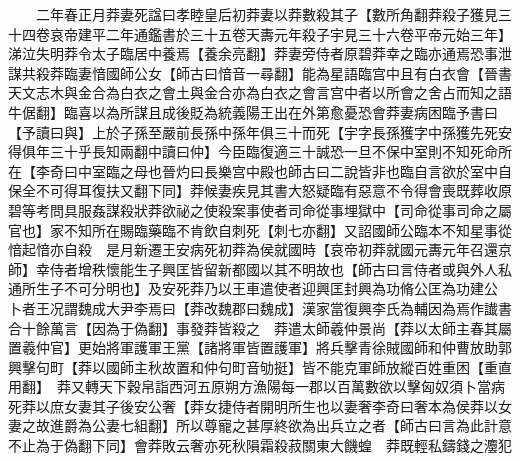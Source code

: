 　　二年春正月莽妻死諡曰孝睦皇后初莽妻以莽數殺其子【數所角翻莽殺子獲見三十四卷哀帝建平二年通鑑書於三十五卷天夀元年殺子宇見三十六卷平帝元始三年】涕泣失明莽令太子臨居中養焉【養余亮翻】莽妻旁侍者原碧莽幸之臨亦通焉恐事泄謀共殺莽臨妻愔國師公女【師古曰愔音一尋翻】能為星語臨宫中且有白衣會【晉書天文志木與金合為白衣之會土與金合亦為白衣之會言宫中者以所會之舍占而知之語牛倨翻】臨喜以為所謀且成後貶為統義陽王出在外第愈憂恐會莽妻病困臨予書曰【予讀曰與】上於子孫至嚴前長孫中孫年俱三十而死【宇字長孫獲字中孫獲先死安得俱年三十乎長知兩翻中讀曰仲】今臣臨復適三十誠恐一旦不保中室則不知死命所在【李奇曰中室臨之母也晉灼曰長樂宫中殿也師古曰二說皆非也臨自言欲於室中自保全不可得耳復扶又翻下同】莽候妻疾見其書大怒疑臨有惡意不令得會喪既葬收原碧等考問具服姦謀殺狀莽欲祕之使殺案事使者司命從事埋獄中【司命從事司命之屬官也】家不知所在賜臨藥臨不肯飲自刺死【刺七亦翻】又詔國師公臨本不知星事從愔起愔亦自殺　是月新遷王安病死初莽為侯就國時【哀帝初莽就國元夀元年召還京師】幸侍者增秩懷能生子興匡皆留新都國以其不明故也【師古曰言侍者或與外人私通所生子不可分明也】及安死莽乃以王車遣使者迎興匡封興為功脩公匡為功建公　卜者王况謂魏成大尹李焉曰【莽改魏郡曰魏成】漢家當復興李氏為輔因為焉作䜟書合十餘萬言【因為于偽翻】事發莽皆殺之　莽遣太師羲仲景尚【莽以太師主春其屬置羲仲官】更始將軍護軍王黨【諸將軍皆置護軍】將兵擊青徐賊國師和仲曹放助郭興擊句町【莽以國師主秋故置和仲句町音劬挺】皆不能克軍師放縱百姓重困【重直用翻】　莽又轉天下穀帛詣西河五原朔方漁陽每一郡以百萬數欲以擊匈奴須卜當病死莽以庶女妻其子後安公奢【莽女捷侍者開明所生也以妻奢李奇曰奢本為侯莽以女妻之故進爵為公妻七組翻】所以尊寵之甚厚終欲為出兵立之者【師古曰言為此計意不止為于偽翻下同】會莽敗云奢亦死秋隕霜殺菽關東大饑蝗　莽既輕私鑄錢之灋犯

